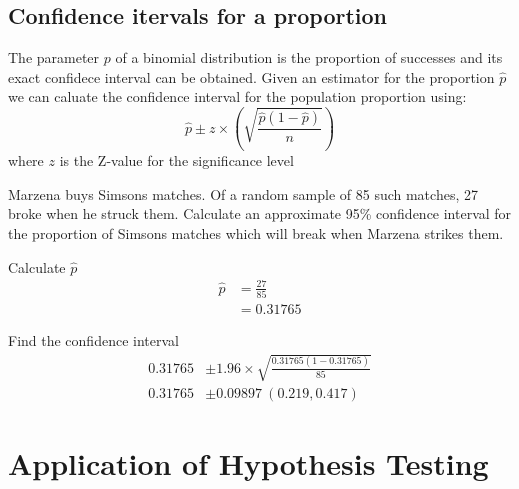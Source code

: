     \newpage
    \subsection{Confidence itervals for a proportion}
        The parameter $p$ of a binomial distribution is the proportion of successes and its exact confidece interval can be obtained. Given an estimator for the proportion $\hat{p}$ we can caluate the confidence interval for the population proportion using: 
        $$\hat{p} \pm z \times \left(\sqrt{\frac{\hat{p}(1-\hat{p})}{n}}\right)$$ 
        where $z$ is the Z-value for the significance level

        \begin{example}
        {
            Marzena buys Simsons matches. Of a random sample of 85 such matches, 27 broke when he struck them. Calculate an approximate 95\% confidence interval for the proportion of Simsons matches which will break when Marzena strikes them.
        }

        \begin{step}{Calculate $\hat{p}$}
        \begin{align*}
        \hat{p} &= \frac{27}{85} \\
                   &= 0.31765
        \end{align*}
        \end{step}

        \begin{step}{Find the confidence interval}
        \begin{align*}
        0.31765 &\pm 1.96 \times \sqrt{\frac{0.31765(1-0.31765)}{85}} \\ 
        0.31765 &\pm 0.09897\ (0.219, 0.417) 
        \end{align*}
        \end{step}

        \end{example}

\newpage
\section{Application of Hypothesis Testing}